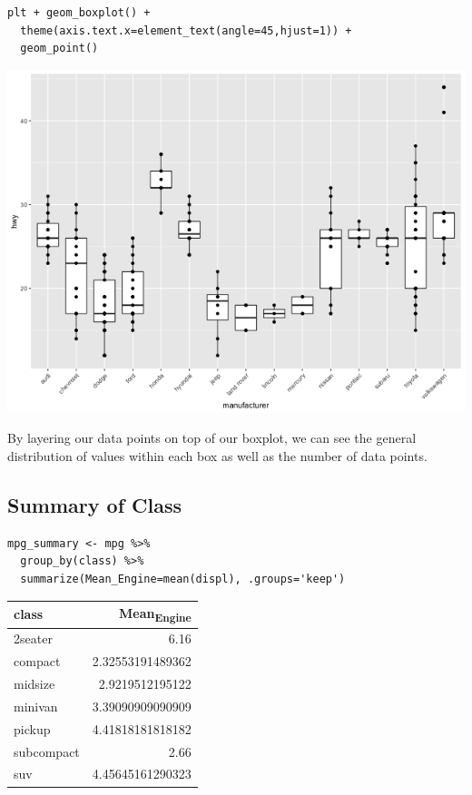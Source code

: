 \documentclass[11pt]{article}
\begin{document}
\begin{org}
\begin{center}
\begin{tabular}{}
\hline
\end{tabular}
\end{center}
\end{org}

\begin{verbatim}
plt + geom_boxplot() +
  theme(axis.text.x=element_text(angle=45,hjust=1)) +
  geom_point()
\end{verbatim}

\begin{org}
\begin{center}
\includegraphics[width=.9\linewidth]{./resources/mpg_layer1.png}
\end{center}
\end{org}

By layering our data points on top of our boxplot, we can see the general distribution of values within each box as well as the number of data points.

\subsection{Summary of Class}
\label{sec:org5cac4ed}

\begin{verbatim}
mpg_summary <- mpg %>%
  group_by(class) %>%
  summarize(Mean_Engine=mean(displ), .groups='keep')
\end{verbatim}

\begin{org}
\begin{center}
\begin{tabular}{lr}
class & Mean\textsubscript{Engine}\\
\hline
2seater & 6.16\\
compact & 2.32553191489362\\
midsize & 2.9219512195122\\
minivan & 3.39090909090909\\
pickup & 4.41818181818182\\
subcompact & 2.66\\
suv & 4.45645161290323\\
\end{tabular}
\end{center}
\end{org}
\end{document}
